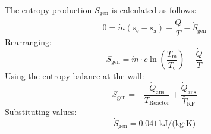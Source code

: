 The entropy production \( \dot{S}_{\text{gen}} \) is calculated as follows:  
\[
0 = \dot{m} (s_{\text{e}} - s_{\text{a}}) + \frac{\dot{Q}}{T} - \dot{S}_{\text{gen}}
\]  
Rearranging:  
\[
\dot{S}_{\text{gen}} = \dot{m} \cdot c \ln \left( \frac{T_{\text{m}}}{T_{\text{e}}} \right) - \frac{\dot{Q}}{T}
\]  
Using the entropy balance at the wall:  
\[
\dot{S}_{\text{gen}} = -\frac{\dot{Q}_{\text{aus}}}{T_{\text{Reactor}}} + \frac{\dot{Q}_{\text{aus}}}{\bar{T}_{\text{KF}}}
\]  
Substituting values:  
\[
\dot{S}_{\text{gen}} = 0.041 \, \text{kJ/(kg·K)}
\]
